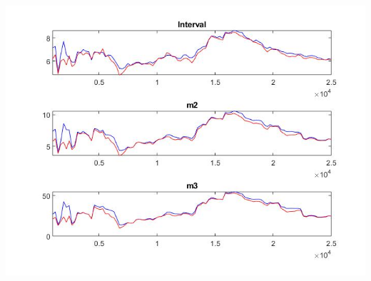 \documentclass[11pt,preprint, authoryear]{elsarticle}
\let\origfigure\figure
\let\endorigfigure\endfigure
\renewenvironment{figure}[1][2] {
    \expandafter\origfigure\expandafter[H]
} {
    \endorigfigure
}
\numberwithin{equation}{section}
\numberwithin{figure}{section}
\numberwithin{table}{section}
\begin{document}
\begin{figure}
\caption{MCMC general - Flexible Money Growth Rate Rule}
\centering
\includegraphics[scale=0.5]{mcflex.jpg}
\label{mcflex}
\end{figure}
\end{document}
